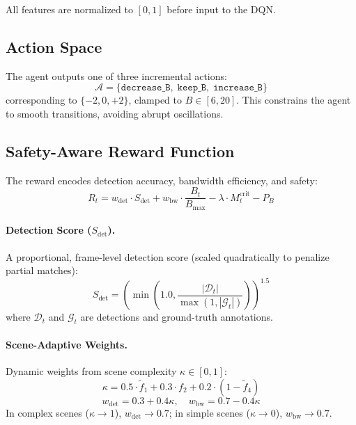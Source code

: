 \documentclass[10pt,journal]{IEEEtran}
\begin{document}
All features are normalized to $[0, 1]$ before input to the DQN.

\subsection{Action Space}

The agent outputs one of three incremental actions:
\begin{equation}
\label{eq:actions}
    \mathcal{A} = \{\texttt{decrease\_B},\; \texttt{keep\_B},\; \texttt{increase\_B}\}
\end{equation}
corresponding to $\{-2, 0, +2\}$, clamped to $B \in [6, 20]$. This constrains the agent to smooth transitions, avoiding abrupt oscillations.

\subsection{Safety-Aware Reward Function}
\label{sec:reward}

The reward encodes detection accuracy, bandwidth efficiency, and safety:
\begin{equation}
\label{eq:reward}
    R_t = w_{\text{det}} \cdot S_{\text{det}} + w_{\text{bw}} \cdot \frac{B_t}{B_{\max}} - \lambda \cdot M_t^{\text{crit}} - P_B
\end{equation}

\paragraph{Detection Score ($S_{\text{det}}$).}
A proportional, frame-level detection score (scaled quadratically to penalize partial matches):
\begin{equation}
\label{eq:det_score}
    S_{\text{det}} = \left( \min \left(1.0, \frac{|\mathcal{D}_t|}{\max(1, |\mathcal{G}_t|)} \right) \right)^{1.5}
\end{equation}
where $\mathcal{D}_t$ and $\mathcal{G}_t$ are detections and ground-truth annotations.

\paragraph{Scene-Adaptive Weights.}
Dynamic weights from scene complexity $\kappa \in [0, 1]$:
\begin{equation}
\label{eq:complexity}
    \kappa = 0.5 \cdot \tilde{f}_1 + 0.3 \cdot f_2 + 0.2 \cdot (1 - \tilde{f}_4)
\end{equation}
\begin{equation}
\label{eq:weights}
    w_{\text{det}} = 0.3 + 0.4\kappa, \quad w_{\text{bw}} = 0.7 - 0.4\kappa
\end{equation}
In complex scenes ($\kappa \to 1$), $w_{\text{det}} \to 0.7$; in simple scenes ($\kappa \to 0$), $w_{\text{bw}} \to 0.7$.
\end{document}
